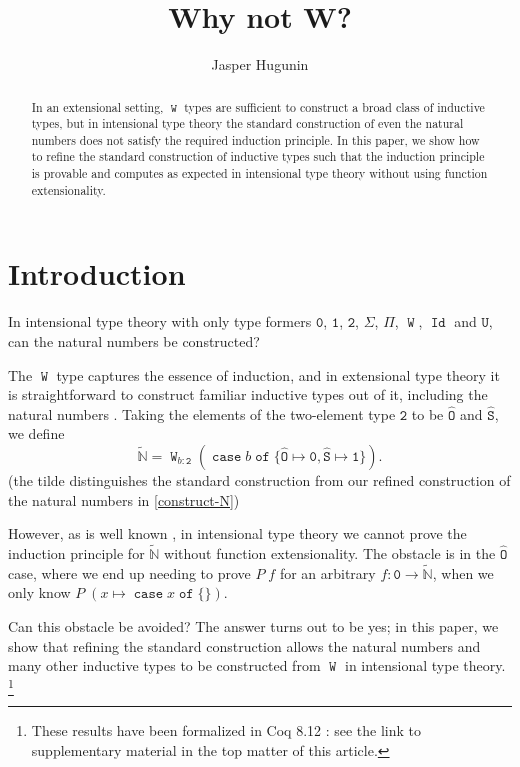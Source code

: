 \documentclass[a4paper,UKenglish,cleveref,nameinlink,autoref,thm-restate]{lipics-v2019}
\title{Why not W?}
\author{Jasper Hugunin}{Carnegie Mellon University, Pittsburgh PA, USA}{jasper@hugunin.net}{https://orcid.org/0000-0002-1133-5354}{}
\newcommand{\zero}{\mathtt{0}}
\newcommand{\one}{\mathtt{1}}
\newcommand{\bool}{\mathtt{2}}
\newcommand{\codeO}{\mathtt{\hat{O}}}
\newcommand{\codeS}{\mathtt{\hat{S}}}
\newcommand{\U}{\mathtt{U}}
\newcommand{\preN}{\hyperref[define-preN]{\tilde{\mathbb{N}}}}
\DeclareMathOperator{\case}{\mathtt{case}}
\newcommand{\caset}[2]{\case {#1}\;\mathtt{of}\;\{{#2}\}}
\DeclareMathOperator{\W}{\mathtt{W}}
\DeclareMathOperator{\Idop}{\mathtt{Id}}
\begin{document}
\maketitle

\begin{abstract}
In an extensional setting, $\W$ types are sufficient to construct a broad class of inductive types, but in intensional type theory the standard construction of even the natural numbers does not satisfy the required induction principle. In this paper, we show how to refine the standard construction of inductive types such that the induction principle is provable and computes as expected in intensional type theory without using function extensionality.
\end{abstract}

\section{Introduction}

In intensional type theory with only type formers $\zero$, $\one$, $\bool$, $\Sigma$, $\Pi$, $\W$, $\Idop$ and $\U$, can the natural numbers be constructed?

The $\W$ type \cite{mltt} captures the essence of induction, and in extensional type theory it is straightforward to construct familiar inductive types out of it, including the natural numbers \cite{dybjer-W-encodes-inductive}.
Taking the elements of the two-element type $\bool$ to be $\codeO$ and $\codeS$, we define \begin{equation}\label{define-preN}\preN = \W_{b : \bool} (\caset{b}{\codeO \mapsto \zero, \codeS \mapsto \one}).\end{equation}
(the tilde distinguishes the standard construction from our refined construction of the natural numbers in \cref{construct-N})

However, as is well known \cite{dybjer-W-encodes-inductive,luo-wellordering,mcbride_wtypes,programming-in-MLTT}, in intensional type theory we cannot prove the induction principle for $\preN$ without function extensionality.
The obstacle is in the $\codeO$ case, where we end up needing to prove $P\;f$ for an arbitrary $f : \zero \to \preN$, when we only know $P\;(x\mapsto\caset{x}{})$.

Can this obstacle be avoided?
The answer turns out to be yes; in this paper, we show that refining the standard construction allows the natural numbers and many other inductive types to be constructed from $\W$ in intensional type theory.
\footnote{These results have been formalized in Coq 8.12 \cite{coq-8.12}: see the link to supplementary material in the top matter of this article.}
\end{document}
